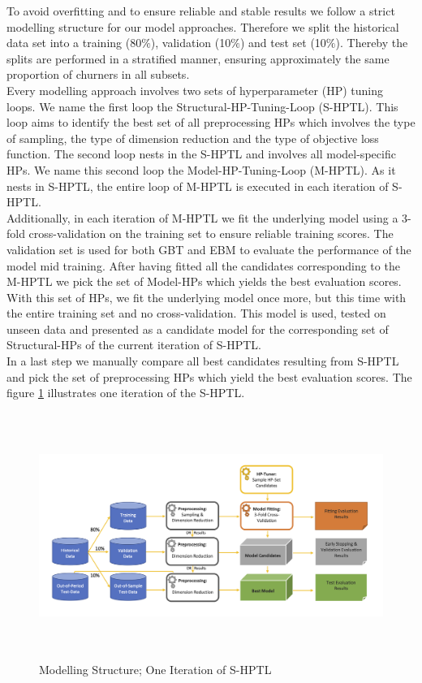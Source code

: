\documentclass[12pt,titlepage]{article}
\begin{document}
To avoid overfitting and to ensure reliable and stable results we follow a strict modelling structure for our model approaches. Therefore we split the historical data set into a training (80$\%$), validation (10$\%$) and test set (10$\%$). Thereby the splits are performed in a stratified manner, ensuring approximately the same proportion of churners in all subsets. \\
Every modelling approach involves two sets of hyperparameter (HP) tuning loops. We name the first loop the Structural-HP-Tuning-Loop (S-HPTL). This loop aims to identify the best set of all preprocessing HPs which involves the type of sampling, the type of dimension reduction and the type of objective loss function. The second loop nests in the S-HPTL and involves all model-specific HPs. We name this second loop the Model-HP-Tuning-Loop (M-HPTL). As it nests in S-HPTL, the entire loop of M-HPTL is executed in each iteration of S-HPTL. \\
Additionally, in each iteration of M-HPTL we fit the underlying model using a 3-fold cross-validation on the training set to ensure reliable training scores. The validation set is used for both GBT and EBM to evaluate the performance of the model mid training. After having fitted all the candidates corresponding to the M-HPTL we pick the set of Model-HPs which yields the best evaluation scores. With this set of HPs, we fit the underlying model once more, but this time with the entire training set and no cross-validation. This model is used, tested on unseen data and presented as a candidate model for the corresponding set of Structural-HPs of the current iteration of S-HPTL. \\
In a last step we manually compare all best candidates resulting from S-HPTL and pick the set of preprocessing HPs which yield the best evaluation scores. The figure \ref{fig:shptl} illustrates one iteration of the S-HPTL. \\
\begin{figure}[H]
    \centerline{\includegraphics[height=8cm]{fitting_tuning_viz.png}}
\caption{Modelling Structure; One Iteration of S-HPTL}
\label{fig:shptl}
\end{figure}
\end{document}
